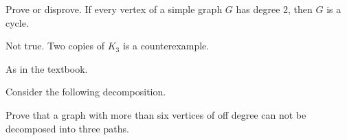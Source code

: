 \begin{problem}
	Prove or disprove. If every vertex of a simple graph $ G $ has degree 2, then $ G $ is a cycle.
\end{problem}
\begin{solution}
	Not true. Two copies of $ K_3 $ is a counterexample.
\end{solution}

\begin{problem}
	As in the textbook.
\end{problem}
\begin{solution}
	Consider the following decomposition.
	
\end{solution}

\begin{problem}
	Prove that a graph with more than six vertices of off degree can not be decomposed into three paths.
\end{problem}











